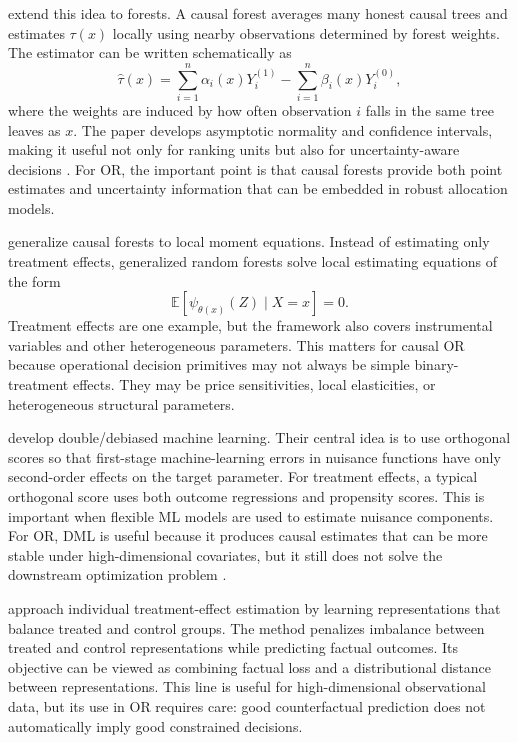 \documentclass[11pt]{article}
\begin{document}
\citet{wager2018causalforest} extend this idea to forests. A causal forest averages many honest causal trees and estimates $\tau(x)$ locally using nearby observations determined by forest weights. The estimator can be written schematically as
\[
    \hat{\tau}(x)
    =
    \sum_{i=1}^{n}\alpha_i(x)Y_i^{(1)}
    -
    \sum_{i=1}^{n}\beta_i(x)Y_i^{(0)},
\]
where the weights are induced by how often observation $i$ falls in the same tree leaves as $x$. The paper develops asymptotic normality and confidence intervals, making it useful not only for ranking units but also for uncertainty-aware decisions \citep{wager2018causalforest}. For OR, the important point is that causal forests provide both point estimates and uncertainty information that can be embedded in robust allocation models.

\citet{athey2019grf} generalize causal forests to local moment equations. Instead of estimating only treatment effects, generalized random forests solve local estimating equations of the form
\[
    \mathbb{E}[\psi_{\theta(x)}(Z)\mid X=x]=0.
\]
Treatment effects are one example, but the framework also covers instrumental variables and other heterogeneous parameters. This matters for causal OR because operational decision primitives may not always be simple binary-treatment effects. They may be price sensitivities, local elasticities, or heterogeneous structural parameters.

\citet{chernozhukov2018dml} develop double/debiased machine learning. Their central idea is to use orthogonal scores so that first-stage machine-learning errors in nuisance functions have only second-order effects on the target parameter. For treatment effects, a typical orthogonal score uses both outcome regressions and propensity scores. This is important when flexible ML models are used to estimate nuisance components. For OR, DML is useful because it produces causal estimates that can be more stable under high-dimensional covariates, but it still does not solve the downstream optimization problem \citep{chernozhukov2018dml}.

\citet{shalit2017estimating} approach individual treatment-effect estimation by learning representations that balance treated and control groups. The method penalizes imbalance between treated and control representations while predicting factual outcomes. Its objective can be viewed as combining factual loss and a distributional distance between representations. This line is useful for high-dimensional observational data, but its use in OR requires care: good counterfactual prediction does not automatically imply good constrained decisions.
\end{document}
